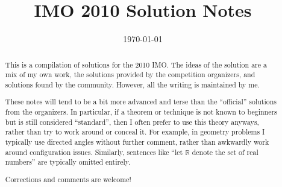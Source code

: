 \documentclass[11pt]{scrartcl}
\title{IMO 2010 Solution Notes}
\date{\today}
\begin{document}
\maketitle

\begin{abstract}
This is a compilation of solutions
for the 2010 IMO.
The ideas of the solution are a mix of my own work,
the solutions provided by the competition organizers,
and solutions found by the community.
However, all the writing is maintained by me.

These notes will tend to be a bit more advanced and terse than the ``official''
solutions from the organizers.
In particular, if a theorem or technique is not known to beginners
but is still considered ``standard'', then I often prefer to
use this theory anyways, rather than try to work around or conceal it.
For example, in geometry problems I typically use directed angles
without further comment, rather than awkwardly work around configuration issues.
Similarly, sentences like ``let $\mathbb{R}$ denote the set of real numbers''
are typically omitted entirely.

Corrections and comments are welcome!
\end{abstract}

\tableofcontents
\newpage

\addtocounter{section}{-1}
\end{document}
